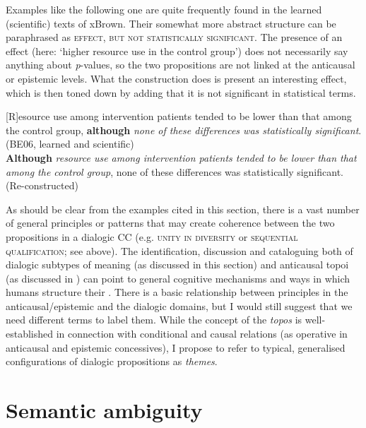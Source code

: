 Examples like the following one are quite frequently found in the learned (scientific) texts of xBrown. Their somewhat more abstract structure can be paraphrased as \textsc{effect, but not statistically significant}. The presence of an effect (here: ‘higher resource use in the control group’) does not necessarily say anything about \textit{p}-values, so the two propositions are not linked at the anticausal or epistemic levels. What the construction does is present an interesting effect, which is then toned down by adding that it is not significant in statistical terms.

\ea\label{ex:61}
    \ea\label{ex:61a}[R]esource use among intervention patients tended to be lower than that among the control group, \textbf{although} \textit{none of these differences was statistically significant}. (BE06, learned and scientific)\\
    \ex\label{ex:61b}\textbf{Although} \textit{resource use among intervention patients tended to be lower than that among the control group}, none of these differences was statistically significant. (Re-constructed)\\
  \z
\z


As should be clear from the examples cited in this section, there is a vast number of general principles or patterns that may create coherence between the two propositions in a dialogic CC (e.g. \textsc{unity in diversity} or \textsc{sequential qualification}; see above). The identification, discussion and cataloguing both of dialogic subtypes of meaning (as discussed in this section) and anticausal topoi (as discussed in ) can point to general cognitive mechanisms and ways in which humans structure their . There is a basic relationship between principles in the anticausal/epistemic and the dialogic domains, but I would still suggest that we need different terms to label them. While the concept of the \textit{topos} is well-established in connection with conditional and causal relations (as operative in anticausal and epistemic concessives), I propose to refer to typical, generalised configurations of dialogic propositions as \textit{themes}.

\section{\label{bkm:Ref487180782}Semantic ambiguity}\label{sec:3.4}

